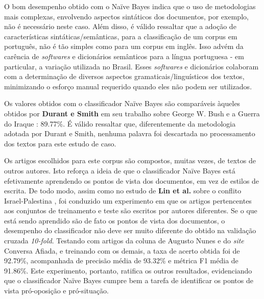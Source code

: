 O bom desempenho obtido com o Naïve Bayes indica que o uso de metodologias mais complexas, envolvendo aspectos sintáticos dos documentos, por exemplo, não é necessário neste caso. Além disso, é válido ressaltar que a adoção de características sintáticas/semânticas, para a classificação de um corpus em português, não é tão simples como para um corpus em inglês. Isso advém  da carência de \emph{softwares} e dicionários semânticos para a língua portuguesa - em particular, a variação utilizada no Brasil. Esses \emph{softwares} e dicionários colaboram com a determinação de diversos aspectos gramaticais/linguísticos dos textos, minimizando o esforço manual requerido quando eles não podem ser utilizados.


Os valores obtidos com o classificador Naïve Bayes são comparáveis àqueles obtidos por \textbf{Durant e Smith} em seu trabalho sobre George W. Bush e a Guerra do Iraque \cite{durant-smith}: 89.77\%. É válido ressaltar que, diferentemente da metodologia adotada por Durant e Smith, nenhuma palavra foi descartada no processamento dos textos para este estudo de caso.  

Os artigos escolhidos para este corpus são compostos, muitas vezes, de textos de outros autores. Isto reforça a ideia de que o classificador Naïve Bayes está efetivamente aprendendo os pontos de vista dos documentos, em vez de estilos de escrita. De todo modo, assim como no estudo de \textbf{Lin et al.} sobre o conflito Israel-Palestina \cite{lin-et-al2006}, foi conduzido um experimento em que os artigos pertencentes aos conjuntos de treinamento e teste são escritos por autores diferentes. Se o que está sendo aprendido são de fato os pontos de vista dos documentos, o desempenho do classificador não deve ser muito diferente do obtido na validação cruzada \emph{10-fold}. Testando com artigos da coluna de Augusto Nunes e do \emph{site} Conversa Afiada, e treinando com os demais, a taxa de acerto obtida foi de 92.79\%, acompanhada de precisão média de 93.32\% e métrica F1 média de 91.86\%. Este experimento, portanto, ratifica os outros resultados, evidenciando que o classificador Naïve Bayes cumpre bem a tarefa de identificar os pontos de vista pró-oposição e pró-situação.




